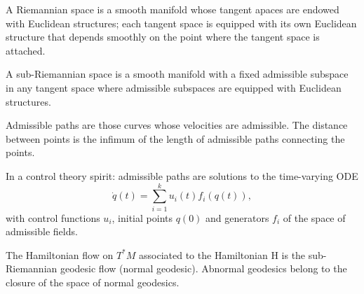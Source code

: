 {A Riemannian space is a smooth manifold whose tangent apaces are endowed with Euclidean structures; each tangent space is equipped with its own Euclidean structure that depends smoothly on the point where the tangent space is attached.	
	
A sub-Riemannian space is a smooth manifold with a fixed admissible subspace in any tangent space where admissible subspaces are equipped with Euclidean structures.

Admissible paths are those curves whose velocities are admissible. The distance between points is the infimum of the length of admissible paths connecting the points.

In a control theory spirit: 
admissible paths are solutions to the time-varying ODE
\begin{equation}
\dot{q} (t) = \sum_{i=1}^{k} u_i(t) f_i(q(t)),
\end{equation}
with control functions $u_i$, initial points $q(0)$ and generators $f_i$ of the space of admissible fields.

The Hamiltonian flow on $T^\ast M$  associated to the Hamiltonian H is the sub-Riemannian geodesic flow (normal geodesic). 
Abnormal geodesics belong to the closure of the space of normal geodesics.
}